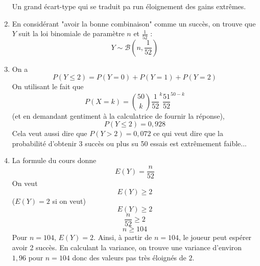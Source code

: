 \begin{enumerate}
Un grand écart-type qui se traduit pa run éloignement des gains extrêmes.
\item En considérant "avoir la bonne combinaison" comme un succès, on trouve que $Y$ suit la loi binomiale de paramètre $n$ et $\displaystyle \frac{1}{52}$ : $$\boxed{Y \sim \mathscr{B}\left(n,\frac{1}{52}\right)}$$
\item On a 
$$P(Y \leq 2) = P(Y=0) + P(Y=1) + P(Y=2)$$
On utilisant le fait que 
$$P(X=k) = \binom{50}{k} \frac{1}{52}^k \frac{51}{52}^{50-k}$$
(et en demandant gentiment à la calculatrice de fournir la réponse), 
$$\boxed{P(Y \leq 2) = 0,928}$$
Cela veut aussi dire que $P(Y> 2) =0,072$ ce qui veut dire que la probabilité d'obtenir 3 succès ou plus su 50 essais est extrêmement faible...
\item La formule du cours donne 
$$\boxed{E(Y) = \frac{n}{52}}$$ 
On veut $$E(Y) \geq 2$$ ($E(Y) =2$ si on veut) 
$$E(Y) \geq 2$$
$$\frac{n}{52} \geq 2$$
$$n \geq 104$$
Pour $n = 104$, $E(Y) = 2$. Ainsi, à partir de $n=104$, le joueur peut espérer avoir 2 succès. En calculant la variance, on trouve une variance d'environ $1,96$ pour $n=104$ donc des valeurs pas très éloignés de $2$.
\end{enumerate}

